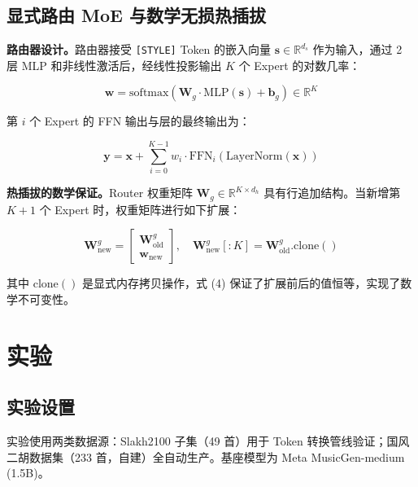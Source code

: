 \documentclass[twocolumn, a4paper, 10pt]{ctexart}
\begin{document}
\subsection{显式路由 MoE 与数学无损热插拔}

\textbf{路由器设计。}路由器接受 \texttt{[STYLE]} Token 的嵌入向量 $\mathbf{s} \in \mathbb{R}^{d_s}$ 作为输入，通过 2 层 MLP 和非线性激活后，经线性投影输出 $K$ 个 Expert 的对数几率：

\begin{equation}
\mathbf{w} = \text{softmax}(\mathbf{W}_g \cdot \text{MLP}(\mathbf{s}) + \mathbf{b}_g) \in \mathbb{R}^K
\end{equation}

第 $i$ 个 Expert 的 FFN 输出与层的最终输出为：

\begin{equation}
\mathbf{y} = \mathbf{x} + \sum_{i=0}^{K-1} w_i \cdot \text{FFN}_i(\text{LayerNorm}(\mathbf{x}))
\end{equation}

\textbf{热插拔的数学保证。}Router 权重矩阵 $\mathbf{W}_g \in \mathbb{R}^{K \times d_h}$ 具有行追加结构。当新增第 $K + 1$ 个 Expert 时，权重矩阵进行如下扩展：

\begin{equation}
\mathbf{W}_{\text{new}}^g = \begin{bmatrix} \mathbf{W}_{\text{old}}^g \\ \mathbf{w}_{\text{new}} \end{bmatrix}, \quad \mathbf{W}_{\text{new}}^g[:K] = \mathbf{W}_{\text{old}}^g.\text{clone}()
\end{equation}

其中 $\text{clone}()$ 是显式内存拷贝操作，式 (4) 保证了扩展前后的值恒等，实现了数学不可变性。


\section{实验}

\subsection{实验设置}
实验使用两类数据源：Slakh2100 子集（49 首）用于 Token 转换管线验证；国风二胡数据集（233 首，自建）全自动生产。基座模型为 Meta MusicGen-medium (1.5B)。
\end{document}
